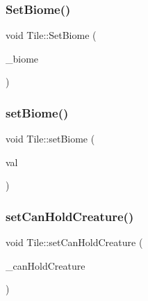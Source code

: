 \mbox{\label{class_tile_a260d7e1e28ffab1cac88fcce8b2fa438}} 
\subsubsection{\texorpdfstring{Set\+Biome()}{SetBiome()}}
{\footnotesize\ttfamily void Tile\+::\+Set\+Biome (\begin{DoxyParamCaption}\item[{\mbox{\hyperlink{_enum_types_8hpp_a5c2255009cd01c90cf68245e6f453d1c}{en\+Biomes}}}]{\+\_\+biome }\end{DoxyParamCaption})}

\mbox{\label{class_tile_abc32adecb440f996c755cfc7e29fb3b0}} 
\subsubsection{\texorpdfstring{set\+Biome()}{setBiome()}}
{\footnotesize\ttfamily void Tile\+::set\+Biome (\begin{DoxyParamCaption}\item[{\mbox{\hyperlink{class_biome}{Biome}}}]{val }\end{DoxyParamCaption})}

\mbox{\label{class_tile_adac9bd5918f12cd0797c36db1e608e44}} 
\subsubsection{\texorpdfstring{set\+Can\+Hold\+Creature()}{setCanHoldCreature()}}
{\footnotesize\ttfamily void Tile\+::set\+Can\+Hold\+Creature (\begin{DoxyParamCaption}\item[{bool}]{\+\_\+can\+Hold\+Creature }\end{DoxyParamCaption})}

\mbox{\label{class_tile_a2975ab14bb24641a095196c34ca42e74}} 
